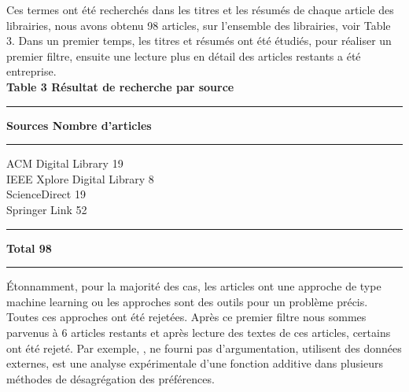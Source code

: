 \documentclass[a4paper, 11pt]{article}
\renewcommand{\textbf}[1]{\begingroup\bfseries\mathversion{bold}#1\endgroup}
\begin{document}

\vspace{1cm}

Ces termes ont été recherchés dans les titres et les résumés de chaque article des librairies, nous avons obtenu 98 articles, sur l'ensemble des librairies, voir Table 3. Dans un premier temps, les titres et résumés ont été étudiés, pour réaliser un premier filtre, ensuite une lecture plus en détail des articles restants a été entreprise.\\


\noindent \textbf{Table 3} Résultat de recherche par source
\begin{center}
\begin{minipage}{0.7\textwidth}
\hrule \vspace{.2cm}
\noindent	\textbf{Sources}  	\hfill	\textbf{Nombre d'articles}
\vspace{.2cm}
\hrule \vspace{.2cm}
\noindent ACM Digital Library \hfill 19\hspace*{.2cm}\\
     	IEEE Xplore Digital Library \hfill 8\hspace*{.2cm}\\
ScienceDirect \hfill 19\hspace*{.2cm}\\
    Springer Link \hfill 52\hspace*{.2cm}\\
   \vspace{-.2cm}
\hrule
\vspace{.2cm}
\textbf{Total} \hfill 98\hspace*{.05cm}
\vspace{.2cm}
\hrule
\vspace{1cm}
\end{minipage}
\end{center}

\vspace{-.7cm}
Étonnamment, pour la majorité des cas, les articles ont une approche de type machine learning ou les approches sont des outils pour un problème précis. Toutes ces approches ont été rejetées. Après ce premier filtre nous sommes parvenus à 6 articles restants et après lecture des textes de ces articles, certains ont été rejeté. Par exemple, \textcolor{blue}{\citep{DelleSite2009}}, ne fourni pas d'argumentation,  \textcolor{blue}{\citep{YEVSEYEVA201636}} utilisent des données externes, \textcolor{blue}{\citep{KADZINSKI2017146}} est une analyse expérimentale d'une fonction additive dans plusieurs méthodes de désagrégation des préférences.\\
\end{document}
